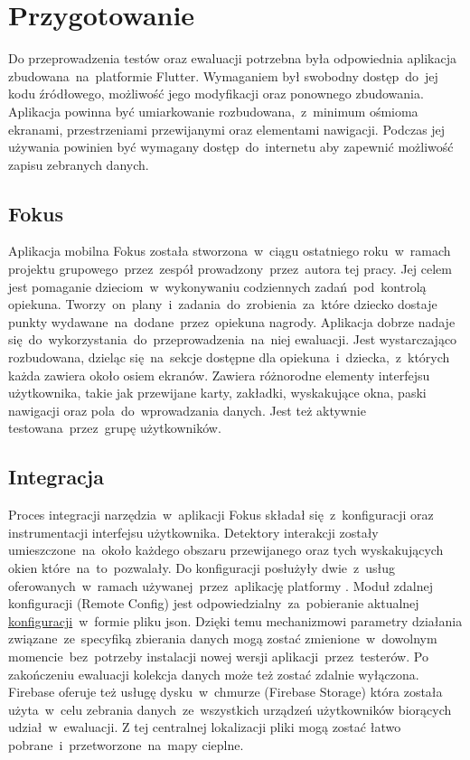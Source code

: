 \section{Przygotowanie}
Do przeprowadzenia testów oraz ewaluacji potrzebna była odpowiednia aplikacja zbudowana~na~platformie Flutter. Wymaganiem był swobodny dostęp~do~jej kodu źródłowego, możliwość jego modyfikacji oraz ponownego zbudowania. Aplikacja powinna być umiarkowanie rozbudowana,~z~minimum ośmioma ekranami, przestrzeniami przewijanymi oraz elementami nawigacji. Podczas jej używania powinien być wymagany dostęp~do~internetu aby zapewnić możliwość zapisu zebranych danych. 

\subsection{Fokus}
Aplikacja mobilna Fokus została stworzona~w~ciągu ostatniego roku~w~ramach projektu grupowego~przez~zespół prowadzony~przez~autora tej pracy. Jej celem jest pomaganie dzieciom~w~wykonywaniu codziennych zadań~pod~kontrolą opiekuna. Tworzy~on~plany~i~zadania~do~zrobienia~za~które dziecko dostaje punkty wydawane~na~dodane~przez~opiekuna nagrody. Aplikacja dobrze nadaje się~do~wykorzystania~do~przeprowadzenia~na~niej ewaluacji. Jest wystarczająco rozbudowana, dzieląc się~na~sekcje dostępne dla opiekuna~i~dziecka,~z~których każda zawiera około osiem ekranów. Zawiera różnorodne elementy interfejsu użytkownika, takie jak przewijane karty, zakładki, wyskakujące okna, paski nawigacji oraz pola~do~wprowadzania danych. Jest też aktywnie testowana~przez~grupę użytkowników.

\subsection{Integracja}
Proces integracji narzędzia~w~aplikacji Fokus składał się~z~konfiguracji oraz instrumentacji interfejsu użytkownika. Detektory interakcji zostały umieszczone~na~około każdego obszaru przewijanego oraz tych wyskakujących okien które~na~to~pozwalały. Do konfiguracji posłużyły dwie~z~usług oferowanych~w~ramach używanej~przez~aplikację platformy . Moduł zdalnej konfiguracji (Remote Config) jest odpowiedzialny~za~pobieranie aktualnej \hyperref[sec:rs_config]{konfiguracji}~w~formie pliku json. Dzięki temu mechanizmowi parametry działania związane~ze~specyfiką zbierania danych mogą zostać zmienione~w~dowolnym momencie~bez~potrzeby instalacji nowej wersji aplikacji~przez~testerów. Po zakończeniu ewaluacji kolekcja danych może też zostać zdalnie wyłączona. Firebase oferuje też usługę dysku~w~chmurze (Firebase Storage) która została użyta~w~celu zebrania danych~ze~wszystkich urządzeń użytkowników biorących udział~w~ewaluacji. Z tej centralnej lokalizacji pliki mogą zostać łatwo pobrane~i~przetworzone~na~mapy cieplne.
